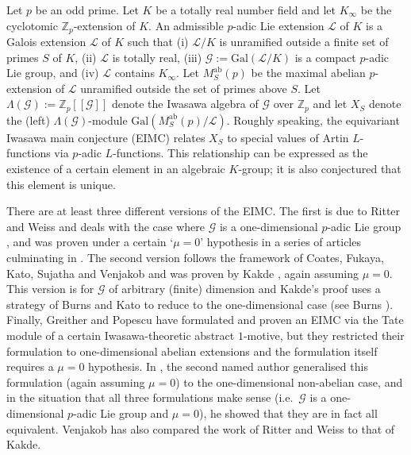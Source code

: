 \documentclass[12pt]{amsart}
\theoremstyle{plain}
\theoremstyle{remark}
\theoremstyle{definition}
\numberwithin{equation}{section}
\begin{document}
Let $p$ be an odd prime.
Let $K$ be a totally real number field and let $K_{\infty}$ be the cyclotomic ${\mathbb{Z}}_{p}$-extension of $K$.
An admissible $p$-adic Lie extension $\mathcal{L}$ of $K$ is a Galois extension $\mathcal{L}$ of $K$ such that 
(i) $\mathcal{L}/K$ is unramified outside a finite set of primes $S$ of $K$,
(ii) $\mathcal{L}$ is totally real, (iii) $\mathcal{G} := {\mathrm{Gal}}(\mathcal{L}/K)$ is a compact 
$p$-adic Lie group, and (iv) $\mathcal{L}$ contains $K_{\infty}$. 
Let $M_{S}^{\mathrm{ab}}(p)$ be the maximal abelian $p$-extension of $\mathcal{L}$ unramified outside the set of primes above $S$.
Let $\Lambda(\mathcal{G}):={\mathbb{Z}}_{p}[[\mathcal{G}]]$ denote the Iwasawa algebra of $\mathcal{G}$ over ${\mathbb{Z}}_{p}$
and let $X_{S}$ denote the (left) $\Lambda(\mathcal{G})$-module ${\mathrm{Gal}}(M_{S}^{\mathrm{ab}}(p) / \mathcal{L})$. 
Roughly speaking, the equivariant Iwasawa main conjecture (EIMC) relates $X_{S}$ to special values of Artin $L$-functions
via $p$-adic $L$-functions. This relationship can be expressed as the existence of a certain element in an algebraic $K$-group;
it is also conjectured that this element is unique.
 
There are at least three different versions of the EIMC. 
The first is due to Ritter and Weiss and deals with the case where $\mathcal{G}$ is a one-dimensional $p$-adic Lie group \cite{MR2114937},
and was proven  under a certain `$\mu=0$' hypothesis in a series of articles culminating in \cite{MR2813337}.
The second version follows the framework of Coates, Fukaya, Kato, Sujatha and Venjakob \cite{MR2217048} and 
was proven by Kakde \cite{MR3091976}, again assuming $\mu=0$.
This version is for $\mathcal{G}$ of arbitrary (finite) dimension and Kakde's proof uses a strategy of Burns and Kato to reduce to the one-dimensional case
(see Burns \cite{burns-mc}). Finally, Greither and Popescu \cite{GrP-EIMC} have formulated and proven an EIMC via the Tate module of a certain Iwasawa-theoretic abstract $1$-motive, but they restricted their formulation to one-dimensional abelian extensions and the formulation itself
requires a $\mu=0$ hypothesis.
In \cite{MR3072281}, the second named author generalised this formulation (again assuming $\mu=0$) to the one-dimensional non-abelian case, and in the situation that all three formulations make sense (i.e.\ $\mathcal{G}$ is a one-dimensional $p$-adic Lie group and $\mu=0$), 
he showed that they are in fact all equivalent.
Venjakob \cite{MR3068897} has also compared the work of Ritter and Weiss to that of Kakde.
\end{document}
